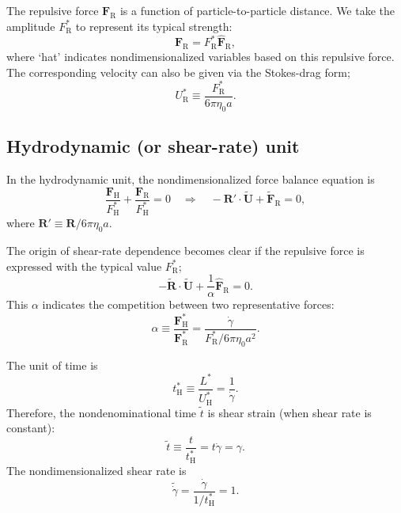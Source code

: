 \documentclass[fontsize=11pt]{scrartcl}
\begin{document}
The repulsive force $\bm{F}_{\mathrm{R}}$ 
is a function of particle-to-particle distance.
%
We take the amplitude $F_{\mathrm{R}}^{\ast}$
to represent its typical strength:
%
\begin{equation}
 \bm{F}_{\mathrm{R}} =  F_{\mathrm{R}}^{\ast}
\hat{\bm{F}}_{\mathrm{R}},
\end{equation}
where `hat' indicates nondimensionalized variables
based on this repulsive force.
%
The corresponding velocity can also be
given via the Stokes-drag form;
\begin{equation}
 U^{\ast}_{\mathrm{R}}
  \equiv \frac{F_{\mathrm{R}}^{\ast}}{6\pi\eta_0 a}.
\end{equation}
%

\subsection*{Hydrodynamic (or shear-rate) unit}

In the hydrodynamic unit, the nondimensionalized
force balance equation is
\begin{equation}
 \frac{\bm{F}_{\mathrm{H}}}{F^{\ast}_{\mathrm{H}}}
  +
  \frac{\bm{F}_{\mathrm{R}}}{F^{\ast}_{\mathrm{H}}}  = 0
  \quad
  \Longrightarrow 
    \quad
 - \bm{R}' \cdot \tilde{\bm{U}} + \tilde{\bm{F}}_{\mathrm{R}} = 0,
\end{equation}
where
$\bm{R}' \equiv \bm{R} / 6 \pi \eta_0 a $.

The origin of shear-rate dependence
becomes clear if the repulsive force
is expressed with the typical value $F_{\mathrm{R}}^{\ast}$;
%
\begin{equation}
 - \tilde{\bm{R}} \cdot \tilde{\bm{U}} +
\frac{1}{\alpha}  \hat{\bm{F}}_{\mathrm{R}} = 0.
\end{equation}
%
This $\alpha$ indicates the competition between two representative forces:
\begin{equation}
 \alpha \equiv
\frac{\bm{F}_{\mathrm{H}}^{\ast}}{\bm{F}_{\mathrm{R}}^{\ast}}
=
  \frac{\dot{\gamma}}{F_{\mathrm{R}}^{\ast}/6\pi\eta_0 a^2}\label{102734_31May15}.
\end{equation}


The unit of time is
\begin{equation}
 t_{\mathrm{H}}^{\ast} \equiv \frac{L^{\ast}}{U_{\mathrm{H}}^{\ast}}
  = \frac{1}{\dot{\gamma}}.
\end{equation}
Therefore, the nondenominational time $\tilde{t}$
is shear strain (when shear rate is constant):
\begin{equation} 
 \tilde{t} \equiv \frac{t}{t_{\mathrm{H}}^{\ast}} = t \dot{\gamma}
   = \gamma.
\end{equation}
%
The nondimensionalized shear rate is
\begin{equation}
 \tilde{\dot{\gamma}}
  =
  \frac{ \dot{\gamma}}{1/t_{\mathrm{H}}^{\ast}}
   = 1.
\end{equation}
\end{document}
